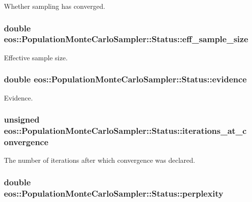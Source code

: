 Whether sampling has converged. \hypertarget{structeos_1_1PopulationMonteCarloSampler_1_1Status_a35814022e64d939f7164ece7a796c07e}{
\subsubsection[{eff\_\-sample\_\-size}]{\setlength{\rightskip}{0pt plus 5cm}double {\bf eos::PopulationMonteCarloSampler::Status::eff\_\-sample\_\-size}}}
\label{structeos_1_1PopulationMonteCarloSampler_1_1Status_a35814022e64d939f7164ece7a796c07e}


Effective sample size. \hypertarget{structeos_1_1PopulationMonteCarloSampler_1_1Status_ab762703da0930ae2182b696b85358b53}{
\subsubsection[{evidence}]{\setlength{\rightskip}{0pt plus 5cm}double {\bf eos::PopulationMonteCarloSampler::Status::evidence}}}
\label{structeos_1_1PopulationMonteCarloSampler_1_1Status_ab762703da0930ae2182b696b85358b53}


Evidence. \hypertarget{structeos_1_1PopulationMonteCarloSampler_1_1Status_a6b30cf9e83650e861475f2f0036c09b0}{
\subsubsection[{iterations\_\-at\_\-convergence}]{\setlength{\rightskip}{0pt plus 5cm}unsigned {\bf eos::PopulationMonteCarloSampler::Status::iterations\_\-at\_\-convergence}}}
\label{structeos_1_1PopulationMonteCarloSampler_1_1Status_a6b30cf9e83650e861475f2f0036c09b0}


The number of iterations after which convergence was declared. \hypertarget{structeos_1_1PopulationMonteCarloSampler_1_1Status_a468aeeb618c761543be6d6833347e296}{
\subsubsection[{perplexity}]{\setlength{\rightskip}{0pt plus 5cm}double {\bf eos::PopulationMonteCarloSampler::Status::perplexity}}}
\label{structeos_1_1PopulationMonteCarloSampler_1_1Status_a468aeeb618c761543be6d6833347e296}


